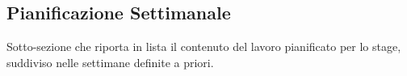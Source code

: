 \subsection{Pianificazione Settimanale}

Sotto-sezione che riporta in lista il contenuto del lavoro pianificato per lo stage, suddiviso nelle settimane definite a priori.